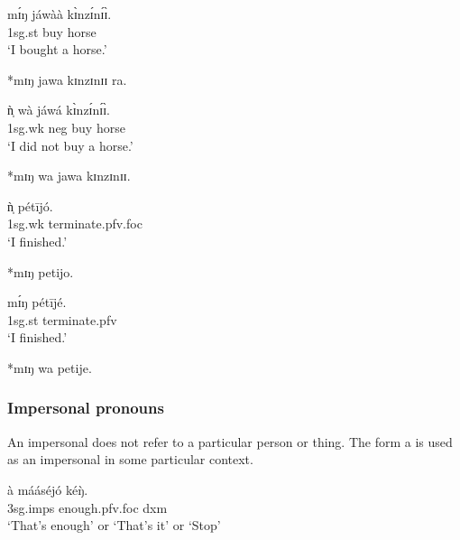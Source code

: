 \begin{exe}
\begin{exe}
\begin{exe}
\begin{exe}
\begin{exe}
\begin{exe}
\begin{exe}
\begin{exe}
\ea\label{ex:GRM-weak-strong-arg} 
   \ea\label{ex:GRM-out-STR-FOC-buy-g}
\gll   mɪ́ŋ   jáwàà   kɪ̀nzɪ́nɪ́ɪ̀.\\
  {\sc 1sg.st}  buy  horse\\
\glt  `I bought a horse.' 

   \ex\label{ex:GRM-out-STR-FOC-buy}
 *mɪŋ   jawa   kɪnzɪnɪɪ ra.
   
   
%    
   \ex 
\gll ǹ̩ wà jáwá kɪ̀nzɪ́nɪ́ɪ̀.\\
 {\sc 1sg.wk} {\sc neg} buy  horse\\
\glt  `I did not buy a horse.' 
  

   \ex\label{ex:GRM-out-STR-NEG-buy}
  *mɪŋ wa  jawa   kɪnzɪnɪɪ.
  
     \ex\label{ex:GRM-out-STR-FOC-finish-g}
\gll ǹ̩   pétījó.\\
 {\sc 1sg.wk}  {terminate.{\sc pfv.foc}}\\
\glt  `I finished.' 


   \ex\label{ex:GRM-out-STR-FOC-finish}
  *mɪŋ   petijo.

   \ex 
\gll mɪ́ŋ   pétījé.\\
  {\sc  1sg.st} {terminate.{\sc pfv}}\\
\glt   `I finished.'  

   \ex\label{ex:GRM-out-STR-NEG-finish}
  *mɪŋ   wa petije.
 
   
  \z 
     
 \z
  
  
 \subsubsection{Impersonal pronouns}
 \label{sec:GRM-impers-pro}

An impersonal  does  not refer to a particular person or thing. The form
{\sls a} is used as an impersonal  in some particular context.

      
\begin{exe} 
\ex\label{ex:imps-pro-sing}
\gll à mááséjó kéŋ̀.\\
  {\sc 3sg.imps}  enough.{\sc pfv.foc} {\sc dxm}\\
\glt `That's enough' or `That's it' or `Stop'
\z


\end{exe}
\end{exe}
\end{exe}
\end{exe}
\end{exe}
\end{exe}
\end{exe}
\end{exe}
\end{exe}
